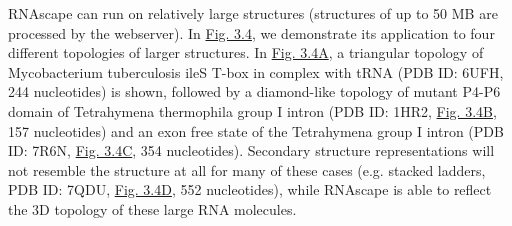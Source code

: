 RNAscape can run on relatively large structures (structures of up to 50 MB are processed by the webserver). In \hyperref[fig:rnascape4]{Fig. 3.4}, we demonstrate its application to four different topologies of larger structures. In \hyperref[fig:rnascape4]{Fig. 3.4A}, a triangular topology of Mycobacterium tuberculosis ileS T-box in complex with tRNA (PDB ID: 6UFH, 244 nucleotides) is shown, followed by a diamond-like topology of mutant P4-P6 domain of Tetrahymena thermophila group I intron (PDB ID: 1HR2, \hyperref[fig:rnascape4]{Fig. 3.4B}, 157 nucleotides) and an exon free state of the Tetrahymena group I intron (PDB ID: 7R6N, \hyperref[fig:rnascape4]{Fig. 3.4C}, 354 nucleotides). Secondary structure representations will not resemble the structure at all for many of these cases (e.g. stacked ladders, PDB ID: 7QDU, \hyperref[fig:rnascape4]{Fig. 3.4D}, 552 nucleotides), while RNAscape is able to reflect the 3D topology of these large RNA molecules.
